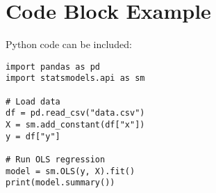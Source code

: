 \section{Code Block Example}
Python code can be included:

\begin{lstlisting}
import pandas as pd
import statsmodels.api as sm

# Load data
df = pd.read_csv("data.csv")
X = sm.add_constant(df["x"])
y = df["y"]

# Run OLS regression
model = sm.OLS(y, X).fit()
print(model.summary())
\end{lstlisting}
